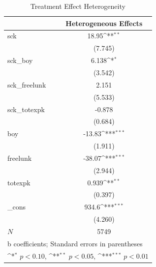 \begin{table}[htbp]\centering
\def\sym#1{\ifmmode^{#1}\else\(^{#1}\)\fi}
\caption{Treatment Effect Heterogeneity}
\begin{tabular}{l*{1}{c}}
\hline\hline
            &\multicolumn{1}{c}{Heterogeneous Effects}\\
\hline
sck         &       18.95\sym{**} \\
            &     (7.745)         \\
[1em]
sck\_boy     &       6.138\sym{*}  \\
            &     (3.542)         \\
[1em]
sck\_freelunk&       2.151         \\
            &     (5.533)         \\
[1em]
sck\_totexpk &      -0.878         \\
            &     (0.684)         \\
[1em]
boy         &      -13.83\sym{***}\\
            &     (1.911)         \\
[1em]
freelunk    &      -38.07\sym{***}\\
            &     (2.944)         \\
[1em]
totexpk     &       0.939\sym{**} \\
            &     (0.397)         \\
[1em]
\_cons      &       934.6\sym{***}\\
            &     (4.260)         \\
\hline
\(N\)       &        5749         \\
\hline\hline
\multicolumn{2}{l}{\footnotesize b coefficients; Standard errors in parentheses}\\
\multicolumn{2}{l}{\footnotesize \sym{*} \(p<0.10\), \sym{**} \(p<0.05\), \sym{***} \(p<0.01\)}\\
\end{tabular}
\end{table}
